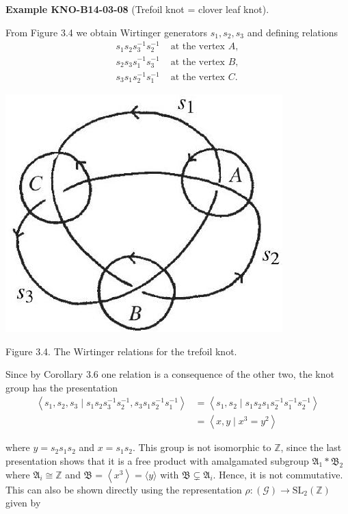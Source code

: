 \documentclass[10pt, letterpaper]{article}
\newcommand{\CustomHeading}[3]{%
  \par\medskip\noindent%
  \textbf{#1 #2} \textnormal{(#3)}.\enskip%
}
\newenvironment{EXA}[2]{\begin{unitbox}\CustomHeading{Example}{#1}{#2}}{\end{unitbox}}
\begin{document}
\begin{EXA}{KNO-B14-03-08}{Trefoil knot = clover leaf knot}
From Figure 3.4 we obtain Wirtinger generators $s_{1}, s_{2}, s_{3}$ and defining relations
$$
\begin{array}{ll}
s_{1} s_{2} s_{3}^{-1} s_{2}^{-1} & \text { at the vertex } A, \\
s_{2} s_{3} s_{1}^{-1} s_{3}^{-1} & \text { at the vertex } B, \\
s_{3} s_{1} s_{2}^{-1} s_{1}^{-1} & \text { at the vertex } C .
\end{array}
$$

\begin{center}
\includegraphics[scale=0.2]{2025_05_21_9c06be8de7a55410f8c1g-049(1)}
\end{center}
Figure 3.4. The Wirtinger relations for the trefoil knot.

Since by Corollary 3.6 one relation is a consequence of the other two, the knot group has the presentation
$$
\begin{aligned}
\left\langle s_{1}, s_{2}, s_{3} \mid s_{1} s_{2} s_{3}^{-1} s_{2}^{-1}, s_{3} s_{1} s_{2}^{-1} s_{1}^{-1}\right\rangle & =\left\langle s_{1}, s_{2} \mid s_{1} s_{2} s_{1} s_{2}^{-1} s_{1}^{-1} s_{2}^{-1}\right\rangle \\
& =\left\langle x, y \mid x^{3}=y^{2}\right\rangle
\end{aligned}
$$

where $y=s_{2} s_{1} s_{2}$ and $x=s_{1} s_{2}$. This group is not isomorphic to $\mathbb{Z}$, since the last presentation shows that it is a free product with amalgamated subgroup $\mathfrak{A}_{1} * \mathfrak{B}_{2}$ where $\mathfrak{A}_{i} \cong \mathbb{Z}$ and $\mathfrak{B}=\left\langle x^{3}\right\rangle=\langle y\rangle$ with $\mathfrak{B} \subsetneq \mathfrak{A}_{i}$. Hence, it is not commutative. This can also be shown directly using the representation $\rho:(\mathcal{G}) \rightarrow \mathrm{SL}_{2}(\mathbb{Z})$ given by


\end{EXA}
\end{document}
